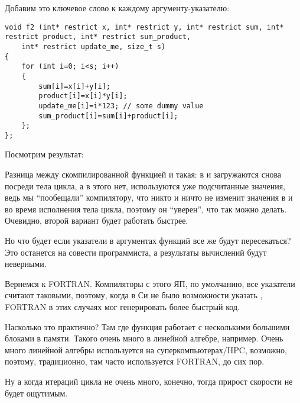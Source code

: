 Добавим это ключевое слово к каждому аргументу-указателю:

\begin{lstlisting}
void f2 (int* restrict x, int* restrict y, int* restrict sum, int* restrict product, int* restrict sum_product, 
	int* restrict update_me, size_t s)
{
	for (int i=0; i<s; i++)
	{
		sum[i]=x[i]+y[i];
		product[i]=x[i]*y[i];
		update_me[i]=i*123; // some dummy value
		sum_product[i]=sum[i]+product[i];	
	};
};
\end{lstlisting}

Посмотрим результат:





Разница между скомпилированной функцией  и  такая: 
в   и  загружаются снова посреди тела цикла,
а в  этого нет, используются уже подсчитанные значения, ведь мы ``пообещали'' компилятору, 
что никто и ничто не изменит
значения в  и  во время исполнения тела цикла, поэтому он ``уверен'', что так можно делать. 
Очевидно, второй вариант будет работать быстрее.

Но что будет если указатели в аргументах функций все же будут пересекаться? Это останется на совести программиста, 
а результаты вычислений будут неверными.

Вернемся к FORTRAN. Компиляторы с этого ЯП, по умолчанию, все указатели считают таковыми, поэтому, когда в Си не было
возможности указать , FORTRAN в этих случаях мог генерировать более быстрый код.

Насколько это практично? Там где функция работает с несколькими большими блоками в памяти. 
Такого очень много в линейной алгебре, например. Очень много линейной алгебры используется на суперкомпьютерах/HPC,
возможно, поэтому, традиционно, там часто используется FORTRAN, до сих пор\cite{Loh:2010:IHP:1810226.1820518}.

Ну а когда итераций цикла не очень много, конечно, тогда прирост скорости не будет ощутимым.

